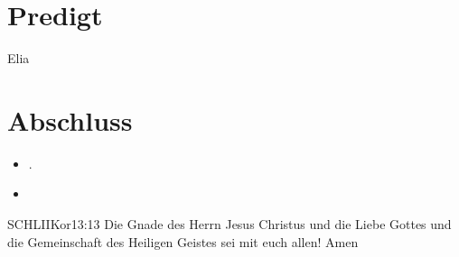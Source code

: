 \documentclass[fontsize=14pt]{mybib}
\newcommand{\Name}{Elia}
\begin{document}
\section{Predigt}
    \Name
\section{Abschluss}
\begin{itemize}
    \item {}.
    \item {}
\end{itemize}
\begin{bibelbox}{SCHL}{IIKor}{13:13}
    Die Gnade des Herrn Jesus Christus und die Liebe Gottes und die Gemeinschaft des Heiligen Geistes sei mit euch allen! Amen
\end{bibelbox}
\end{document}
